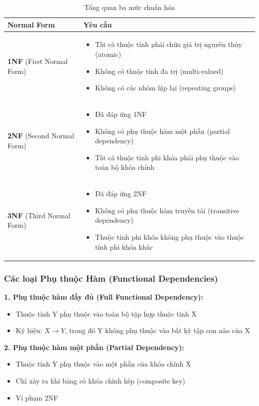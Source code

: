 \documentclass[12pt,a4paper]{article}
\begin{document}
\begin{table}[H]
\centering
\caption{Tổng quan ba mức chuẩn hóa}
\begin{tabular}{@{}|l|p{10cm}|@{}}
\hline
\textbf{Normal Form} & \textbf{Yêu cầu} \\ \hline
\textbf{1NF} (First Normal Form) &
\begin{itemize}
    \item Tất cả thuộc tính phải chứa giá trị nguyên thủy (atomic)
    \item Không có thuộc tính đa trị (multi-valued)
    \item Không có các nhóm lặp lại (repeating groups)
\end{itemize}
\\ \hline
\textbf{2NF} (Second Normal Form) &
\begin{itemize}
    \item Đã đáp ứng 1NF
    \item Không có phụ thuộc hàm một phần (partial dependency)
    \item Tất cả thuộc tính phi khóa phải phụ thuộc vào toàn bộ khóa chính
\end{itemize}
\\ \hline
\textbf{3NF} (Third Normal Form) &
\begin{itemize}
    \item Đã đáp ứng 2NF
    \item Không có phụ thuộc hàm truyền tải (transitive dependency)
    \item Thuộc tính phi khóa không phụ thuộc vào thuộc tính phi khóa khác
\end{itemize}
\\ \hline
\end{tabular}
\end{table}

\subsubsection{Các loại Phụ thuộc Hàm (Functional Dependencies)}

\textbf{1. Phụ thuộc hàm đầy đủ (Full Functional Dependency):}
\begin{itemize}
    \item Thuộc tính Y phụ thuộc vào toàn bộ tập hợp thuộc tính X
    \item Ký hiệu: $X \rightarrow Y$, trong đó Y không phụ thuộc vào bất kỳ tập con nào của X
\end{itemize}

\textbf{2. Phụ thuộc hàm một phần (Partial Dependency):}
\begin{itemize}
    \item Thuộc tính Y phụ thuộc vào một phần của khóa chính X
    \item Chỉ xảy ra khi bảng có khóa chính kép (composite key)
    \item Vi phạm 2NF
\end{itemize}
\end{document}
